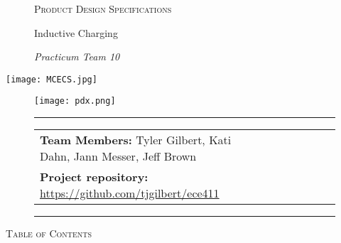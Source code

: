 \thispagestyle{empty}   %

\begin{figure}[t]
    \begin{center}
    {\LARGE \textsc{ Product Design Specifications}}
    \end{center}

    \begin{center}
    \Large Inductive Charging
    \end{center}

    \begin{center}
    \normalsize \textit{Practicum Team 10}
    \end{center}
\end{figure}

\vspace*{\fill}

\begingroup
    \begin{center}
    \texttt{[image: MCECS.jpg]}
    \end{center}
\endgroup
    
\vspace*{\fill}
    
\begin{figure}[b]
    \texttt{[image: pdx.png]}
\end{figure}


    \begin{figure}[!b]
    \begin{center}
    \rule{6in}{0.4pt}
    \begin{minipage}[t]{.75\textwidth}
    \begin{tabular}{llcccll}
    \textbf{Team Members:}  Tyler Gilbert, Kati Dahn, Jann Messer, Jeff Brown & & & &\\
    \textbf{Project repository:} \href{https://github.com/tjgilbert/ece411}{https://github.com/tjgilbert/ece411} \\
    \end{tabular}
    \end{minipage}
    \rule{6in}{0.4pt}
    \end{center}
    \end{figure}
    
\cleardoublepage
{}

\hypertarget{MyToc}{} %
\begin{center}
{\Large \textsc{ Table of Contents}}
\end{center}
\renewcommand{\contentsname}{}
\tableofcontents

\cleardoublepage